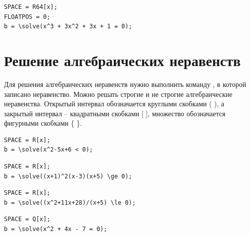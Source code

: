 \begin{verbatim}
SPACE = R64[x];
FLOATPOS = 0;
b = \solve(x^3 + 3x^2 + 3x + 1 = 0);
\end{verbatim}




\section{Решение алгебраических неравенств}

Для решения алгебраических неравенств нужно выполнить команду , в которой записано неравенство.
Можно решать строгие и не строгие алгебраические неравенства. Открытый интервал обозначается круглыми скобками ( ), а закрытый интервал -- квадратными скобками [ ], множество обозначается фигурными скобками \{ \}.


\begin{verbatim}
SPACE = R[x];
b = \solve(x^2-5x+6 < 0);
\end{verbatim}


\begin{verbatim}
SPACE = R[x];
b = \solve((x+1)^2(x-3)(x+5) \ge 0);
\end{verbatim}

\ex{$SPACE=R[x]; $\\
\hspace*{4mm} $b=solve((x+1)^2(x-3)(x+5) \ge 0);$}{$(-\infty,-5] \cup{-1}\cup[3,\infty)$.}

\begin{verbatim}
SPACE = R[x];
b = \solve((x^2+11x+28)/(x+5) \le 0);
\end{verbatim}

\ex{$SPACE=R[x]; $\\
\hspace*{4mm} $b=solve((x^2+11x+28)/(x+5) \le 0);$}{$(-\infty,-7]\cup(-5,-4]$.}

\begin{verbatim}
SPACE = Q[x];
b = \solve(x^2 + 4x - 7 = 0);
\end{verbatim}

